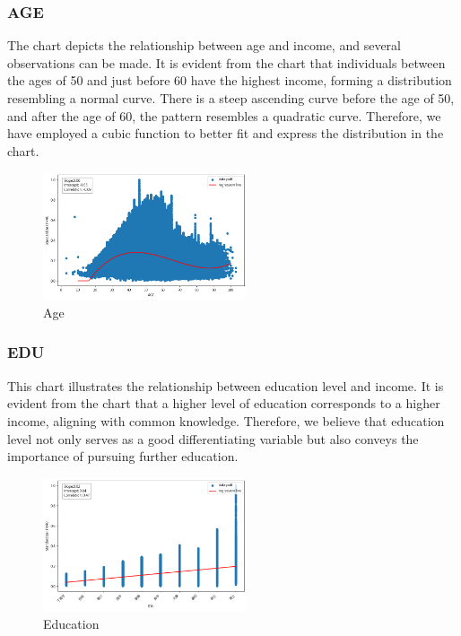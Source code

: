 \documentclass[twocolumn]{article}
\begin{document}
		\subsubsection{AGE}
The chart depicts the relationship between age and income, and several observations can be made. It is evident from the chart that individuals between the ages of 50 and just before 60 have the highest income, forming a distribution resembling a normal curve. There is a steep ascending curve before the age of 50, and after the age of 60, the pattern resembles a quadratic curve. Therefore, we have employed a cubic function to better fit and express the distribution in the chart.
		\begin{figure}[H]
		\centering
		\includegraphics[width=6cm]{AGE.png} 
		\caption{Age} 
		\label{Fig.AGE} 
		\end{figure}
		
		\subsubsection{EDU}
This chart illustrates the relationship between education level and income. It is evident from the chart that a higher level of education corresponds to a higher income, aligning with common knowledge. Therefore, we believe that education level not only serves as a good differentiating variable but also conveys the importance of pursuing further education.		
		\begin{figure}[H]
		\centering
		\includegraphics[width=6cm]{EDU.png} 
		\caption{Education} 
		\label{Fig.EDU} 
		\end{figure}
		
\end{document}

